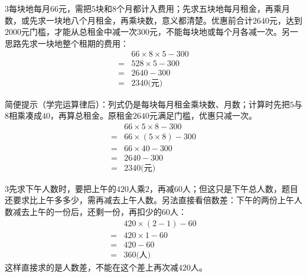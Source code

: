 \documentclass[multi=snippet,border={5bp 20bp 5bp 5bp}]{standalone}
\newenvironment{snippet}[3]{\begin{minipage}{#1bp}\color{answerred}\fontsize{#2}{#3}\selectfont\raggedright}{\end{minipage}}
\begin{document}
\begin{snippet}{505}{11.5}{14}\begin{multicols}{3}\raggedcolumns 每块地每月\(66\)\allowbreak 元，需把\(5\)\allowbreak 块和\(8\)\allowbreak 个月都计入费用；先求五块地每月租金，再乘月数，或先求一块地八个月租金，再乘块数，意义都清楚。优惠前合计\(2640\)\allowbreak 元，达到\(2000\)\allowbreak 元门槛，才能从总租金中减一次\(300\)\allowbreak 元，不能每块地或每个月各减一次。另一思路先求一块地整个租期的费用：\[\begin{aligned}&66\times8\times5-300\\={}&528\times5-300\\={}&2640-300\\={}&2340\text{(元)}\end{aligned}\]\par 简便提示（学完运算律后）：列式仍是每块每月租金乘块数、月数；计算时先把\(5\)\allowbreak 与\(8\)\allowbreak 相乘凑成\(40\)\allowbreak ，再算总租金。原租金\(2640\)\allowbreak 元满足门槛，优惠只减一次。\[\begin{aligned}&66\times5\times8-300\\={}&66\times(5\times8)-300\\={}&66\times40-300\\={}&2640-300\\={}&2340\text{(元)}\end{aligned}\]\end{multicols}\end{snippet}
\begin{snippet}{505}{11.5}{14}\begin{multicols}{3}\raggedcolumns 先求下午人数时，要把上午的\(420\)\allowbreak 人乘\(2\)\allowbreak ，再减\(60\)\allowbreak 人；但这只是下午总人数，题目还要求比上午多多少，需再减去上午人数。另法直接看倍数差：下午的两份上午人数减去上午的一份后，还剩一份，再扣少的\(60\)\allowbreak 人：\[\begin{aligned}&420\times(2-1)-60\\={}&420\times1-60\\={}&420-60\\={}&360\text{(人)}\end{aligned}\]这样直接求的是人数差，不能在这个差上再次减\(420\)\allowbreak 人。\end{multicols}\end{snippet}
\end{document}
